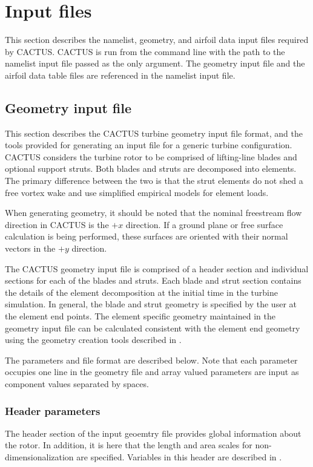 \chapter{Input files}
This section describes the namelist, geometry, and airfoil data input files required by CACTUS. CACTUS is run from the command line with the path to the namelist input file passed as the only argument. The geometry input file and the airfoil data table files are referenced in the namelist input file.

\section{Geometry input file}
This section describes the CACTUS turbine geometry input file format, and the tools provided for generating an input file for a generic turbine configuration. CACTUS considers the turbine rotor to be comprised of lifting-line blades and optional support struts. Both blades and struts are decomposed into elements. The primary difference between the two is that the strut elements do not shed a free vortex wake and use simplified empirical models for element loads.

When generating geometry, it should be noted that the nominal freestream flow direction in CACTUS is the $+x$ direction. If a ground plane or free surface calculation is being performed, these surfaces are oriented with their normal vectors in the $+y$ direction.

The CACTUS geometry input file is comprised of a header section and individual sections for each of the blades and struts. Each blade and strut section contains the details of the element decomposition at the initial time in the turbine simulation. In general, the blade and strut geometry is specified by the user at the element end points. The element specific geometry maintained in the geometry input file can be calculated consistent with the element end geometry using the geometry creation tools described in . 

The parameters and file format are described below. Note that each parameter occupies one line in the geometry file and array valued parameters are input as component values separated by spaces.

\subsection{Header parameters}
The header section of the input geoemtry file provides global information about the rotor. In addition, it is here that the length and area scales for non-dimensionalization are specified. Variables in this header are described in .

